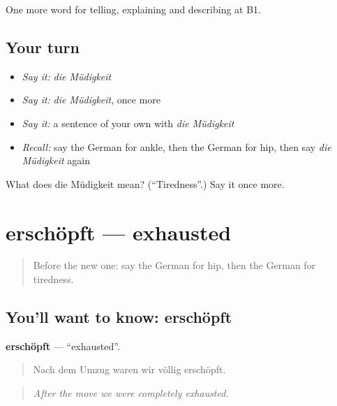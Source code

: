 \begin{grammarlens}[title={What you've built}]
One more word for telling, explaining and describing at B1.
\end{grammarlens}

\subsection*{Your turn}
\begin{itemize}
\raggedright
  \item \emph{Say it:} \emph{die Müdigkeit}
  \item \emph{Say it:} \emph{die Müdigkeit}, once more
  \item \emph{Say it:} a sentence of your own with \emph{die Müdigkeit}
  \item \emph{Recall:} say the German for ankle, then the German for hip, then say \emph{die Müdigkeit} again
\end{itemize}

\begin{tcolorbox}[breakable,colback=teal!4,colframe=teal!35!black,title={Before you move on}]
What does die Müdigkeit mean? (\textquotedblleft{}Tiredness\textquotedblright{}.) Say it once more.
\end{tcolorbox}
\section[erschöpft]{erschöpft — exhausted}

\label{lesson:GE-C486-erschoepft}



\begin{quote}
Before the new one: say the German for hip, then the German for tiredness.
\end{quote}

\subsection*{You'll want to know: erschöpft}
\textbf{erschöpft} — \textquotedblleft{}exhausted\textquotedblright{}.

\begin{quote}
Nach dem Umzug waren wir völlig erschöpft.
\end{quote}

\begin{quote}
\emph{After the move we were completely exhausted.}
\end{quote}

